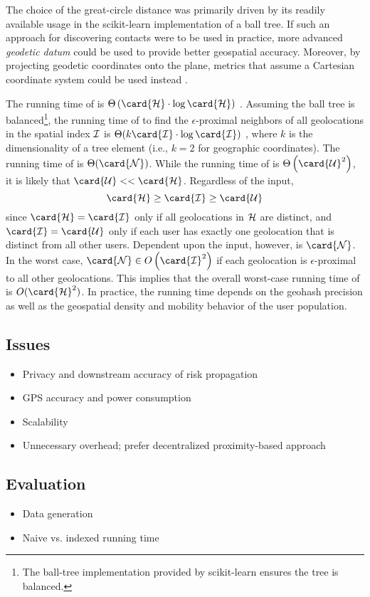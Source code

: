 The choice of the great\hyp{}circle distance was primarily driven by its readily available usage in the scikit\hyp{}learn \cite{sklearn2013} implementation of a ball tree. If such an approach for discovering contacts were to be used in practice, more advanced \emph{geodetic datum} \cite[pp. 71--130]{Lu2014} could be used to provide better geospatial accuracy. Moreover, by projecting geodetic coordinates onto the plane, metrics that assume a Cartesian coordinate system could be used instead \cite[pp. 265--326]{Lu2014}.

The running time of  is $\Theta\left(\card{\histories} \cdot \log\card{\histories}\right)$ \cite{Omohundro1989}. Assuming the ball tree is balanced\footnote{The ball\hyp{}tree implementation provided by scikit\hyp{}learn \cite{sklearn2013} ensures the tree is balanced.}, the running time of   to find the $\epsilon$\hyp{}proximal neighbors of all geolocations in the spatial index $\mathcal{I}$ is $\Theta(k \card{\sindex} \cdot \log\card{\sindex})$ , where $k$ is the dimensionality of a tree element (i.e., $k = 2$ for geographic coordinates). The running time of  is $\Theta(\card{\query})$. While the running time of  is $\Theta\left(\card{\users}^2\right)$, it is likely that $\card{\users} << \card{\histories}$. Regardless of the input,
	\begin{equation*}
		\card{\histories} \geq \card{\sindex} \geq \card{\users}
	\end{equation*}
since $\card{\histories} = \card{\sindex}$ only if all geolocations in $\mathcal{H}$ are distinct, and $\card{\sindex} = \card{\users}$ only if each user has exactly one geolocation that is distinct from all other users. Dependent upon the input, however, is $\card{\query}$. In the worst case, $\card{\query} \in O\left(\card{\sindex}^2\right)$ if each geolocation is $\epsilon$\hyp{}proximal to all other geolocations. This implies that the overall worst\hyp{}case running time of  is $O(\card{\histories}^2)$. In practice, the running time depends on the geohash precision as well as the geospatial density and mobility behavior of the user population.

\subsection{Issues}
	\begin{itemize}
	\item Privacy and downstream accuracy of risk propagation
	\item GPS accuracy and power consumption
	\item Scalability
	\item Unnecessary overhead; prefer decentralized proximity\hyp{}based approach
	\end{itemize}

\subsection{Evaluation}
	\begin{itemize}
	\item Data generation
	\item Naive vs. indexed running time
	\end{itemize}
